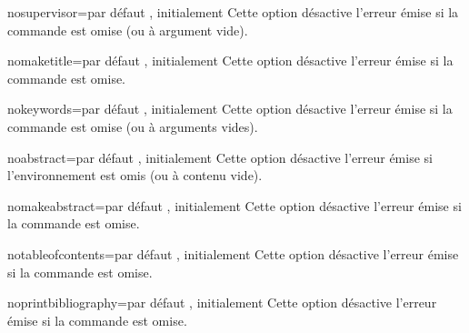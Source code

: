 \begin{docKey}{nosupervisor}{=\textbar{}}{par
    défaut , initialement }
  Cette option désactive l'erreur émise si la commande  est
  omise (ou à argument vide).
\end{docKey}
\begin{docKey}{nomaketitle}{=\textbar{}}{par
    défaut , initialement }
  Cette option désactive l'erreur émise si la commande  est
  omise.
\end{docKey}
\begin{docKey}{nokeywords}{=\textbar{}}{par défaut
    , initialement }
  Cette option désactive l'erreur émise si la commande  est
  omise (ou à arguments vides).
\end{docKey}
\begin{docKey}{noabstract}{=\textbar{}}{par défaut
    , initialement }
  Cette option désactive l'erreur émise si l'environnement 
  est omis (ou à contenu vide).
\end{docKey}
\begin{docKey}{nomakeabstract}{=\textbar{}}{par
    défaut , initialement }
  Cette option désactive l'erreur émise si la commande 
  est omise.
\end{docKey}
\begin{docKey}{notableofcontents}{=\textbar{}}{par
    défaut , initialement }
  Cette option désactive l'erreur émise si la commande 
  est omise.
\end{docKey}
\begin{docKey}{noprintbibliography}{=\textbar{}}{par
    défaut , initialement }
  Cette option désactive l'erreur émise si la commande
   est omise.
\end{docKey}

%
\iffalse
\fi
